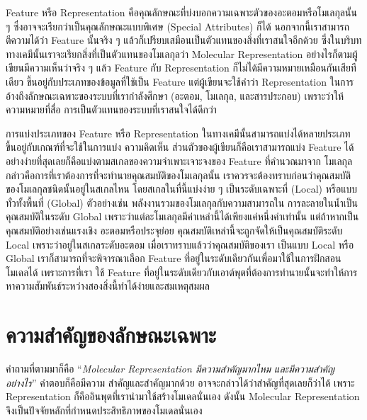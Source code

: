 Feature หรือ Representation คือคุณลักษณะที่บ่งบอกความเฉพาะตัวของอะตอมหรือโมเลกุลนั้น ๆ ซึ่งอาจจะเรียกว่าเป็นคุณลักษณะแบบพิเศษ 
(Special Attributes) ก็ได้ นอกจากนี้เราสามารถตีความได้ว่า Feature นั้นจริง ๆ แล้วก็เปรียบเสมือนเป็นตัวแทนของสิ่งที่เราสนใจอีกด้วย 
ซึ่งในบริบททางเคมีนั้นเราจะเรียกสิ่งที่เป็นตัวแทนของโมเลกุลว่า Molecular Representation อย่างไรก็ตามผู้เขียนมีความเห็นว่าจริง ๆ แล้ว 
Feature กับ Representation ก็ไม่ได้มีความหมายเหมือนกันเสียทีเดียว ขึ้นอยู่กับประเภทของข้อมูลที่ใช้เป็น Feature แต่ผู้เขียนจะใช้คำว่า 
Representation ในการอ้างถึงลักษณะเฉพาะของระบบที่เรากำลังศึกษา (อะตอม, โมเลกุล, และสารประกอบ) เพราะว่าให้ความหมายที่สื่อ%
การเป็นตัวแทนของระบบที่เราสนใจได้ดีกว่า\autocite{stepisnik2021}

การแบ่งประเภทของ Feature หรือ Representation ในทางเคมีนั้นสามารถแบ่งได้หลายประเภท ขึ้นอยู่กับเกณฑ์ที่จะใช้ในการแบ่ง ความคิดเห็น%
ส่วนตัวของผู้เขียนก็คือเราสามารถแบ่ง Feature ได้อย่างง่ายที่สุดเลยก็คือแบ่งตามสเกลของความจำเพาะเจาะจงของ Feature ที่คำนวณมาจาก%
โมเลกุล กล่าวคือการที่เราต้องการที่จะทำนายคุณสมบัติของโมเลกุลนั้น เราควรจะต้องทราบก่อนว่าคุณสมบัติของโมเลกุลชนิดนั้นอยู่ในสเกลไหน 
โดยสเกลในที่นี้แบ่งง่าย ๆ เป็นระดับเฉพาะที่ (Local) หรือแบบทั่วทั้งพื้นที่ (Global) ตัวอย่างเช่น พลังงานรวมของโมเลกุลกับความสามารถใน%
การละลายในน้ำเป็นคุณสมบัติในระดับ Global เพราะว่าแต่ละโมเลกุลมีค่าเหล่านี้ได้เพียงแค่หนึ่งค่าเท่านั้น แต่ถ้าหากเป็นคุณสมบัติอย่างเช่นแรงเชิง%
อะตอมหรือประจุย่อย คุณสมบัติเหล่านี้จะถูกจัดให้เป็นคุณสมบัติระดับ Local เพราะว่าอยู่ในสเกลระดับอะตอม เมื่อเราทราบแล้วว่าคุณสมบัติของเรา%
เป็นแบบ Local หรือ Global เราก็สามารถที่จะพิจารณาเลือก Feature ที่อยู่ในระดับเดียวกันเพื่อมาใช้ในการฝึกสอนโมเดลได้ เพราะการที่เรา%
ใช้ Feature ที่อยู่ในระดับเดียวกับเอาต์พุตที่ต้องการทำนายนั้นจะทำให้การหาความสัมพันธ์ระหว่างสองสิ่งนี้ทำได้ง่ายและสมเหตุสมผล

\section{ความสำคัญของลักษณะเฉพาะ}
\label{sec:why_feature}

คำถามที่ตามมาก็คือ \enquote{\textit{Molecular Representation มีความสำคัญมากไหม และมีความสำคัญอย่างไร}} คำตอบก็คือมีความ%
สำคัญและสำคัญมากด้วย อาจจะกล่าวได้ว่าสำคัญที่สุดเลยก็ว่าได้ เพราะ Representation ก็คืออินพุตที่เรานำมาใช้สร้างโมเดลนั่นเอง 
ดังนั้น Molecular Representation จึงเป็นปัจจัยหลักที่กำหนดประสิทธิภาพของโมเดลนั่นเอง 

